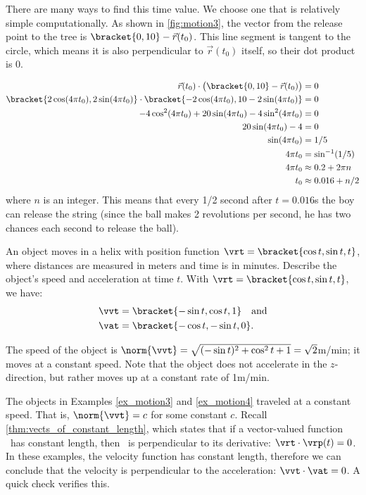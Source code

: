 \begin{example}
\begin{enumerate}
	There are many ways to find this time value. We choose one that is relatively simple computationally. As shown in \autoref{fig:motion3}, the vector from the release point to the tree is $\bracket{0,10}- \vec r(t_0)$. This line segment is tangent to the circle, which means it is also perpendicular to $\vec r(t_0)$ itself, so their dot product is 0.
	
	\begin{align*}
	\vec r(t_0) \cdot \bigl(\bracket{0,10}- \vec r(t_0)\bigr) &=0\\
	\bracket{2\cos (4\pi t_0), 2\sin (4\pi t_0)}\cdot\bracket{-2\cos(4\pi t_0),10-2\sin (4\pi t_0)}&=0\\
	-4\cos^2(4\pi t_0) + 20\sin (4\pi t_0)-4\sin^2(4\pi t_0) &= 0\\
	20\sin (4\pi t_0) - 4 &=0\\
	\sin (4\pi t_0) &=1/5\\
	4\pi t_0 &= \sin^{-1}(1/5)\\
	4\pi t_0 &\approx 0.2 + 2\pi n\\%
	t_0 &\approx 0.016 + n/2
	\end{align*}
	where $n$ is an integer.
	This means that every 1/2 second after $t=0.016$s the boy can release the string (since the ball makes 2 revolutions per second, he has two chances each second to release the ball).
\end{enumerate}
\end{example}

\begin{example}\label{ex_motion4}
An object moves in a helix with position function $\vrt =\bracket{\cos t, \sin t, t}$, where distances are measured in meters and time is in minutes. Describe the object's speed and acceleration at time $t$.
\solution
With $\vrt =\bracket{\cos t,\sin t, t}$, we have:
\begin{align*}
\vvt &=\bracket{-\sin t, \cos t, 1}\quad \text{and} \\
\vat &=\bracket{-\cos t, -\sin t, 0}.
\end{align*}

The speed of the object is $\norm{\vvt} = \sqrt{(-\sin t)^2+\cos^2t+1} = \sqrt{2}$m/min; it moves at a constant speed. Note that the object does not accelerate in the $z$-direction, but rather moves up at a constant rate of 1m/min.
\end{example}

The objects in Examples \ref{ex_motion3} and \ref{ex_motion4} traveled at a constant speed. That is, $\norm{\vvt} = c$ for some constant $c$. Recall \autoref{thm:vects_of_constant_length}, which states that if a vector-valued function \vrt\ has constant length, then \vrt\ is perpendicular to its derivative: $\vrt\cdot\vrp(t) = 0$. In these examples, the velocity function has constant length, therefore we can conclude that the velocity is perpendicular to the acceleration: $\vvt\cdot\vat = 0$. A quick check verifies this.

